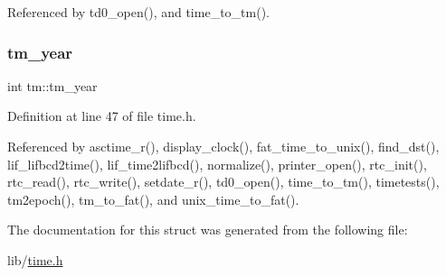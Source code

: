 Referenced by td0\+\_\+open(), and time\+\_\+to\+\_\+tm().

\mbox{\label{structtm_a33adf78fd6476b2120ce3b9c4a852053}} 
\subsubsection{\texorpdfstring{tm\+\_\+year}{tm\_year}}
{\footnotesize\ttfamily int tm\+::tm\+\_\+year}



Definition at line 47 of file time.\+h.



Referenced by asctime\+\_\+r(), display\+\_\+clock(), fat\+\_\+time\+\_\+to\+\_\+unix(), find\+\_\+dst(), lif\+\_\+lifbcd2time(), lif\+\_\+time2lifbcd(), normalize(), printer\+\_\+open(), rtc\+\_\+init(), rtc\+\_\+read(), rtc\+\_\+write(), setdate\+\_\+r(), td0\+\_\+open(), time\+\_\+to\+\_\+tm(), timetests(), tm2epoch(), tm\+\_\+to\+\_\+fat(), and unix\+\_\+time\+\_\+to\+\_\+fat().



The documentation for this struct was generated from the following file\+:\begin{DoxyCompactItemize}
\item 
lib/\hyperlink{time_8h}{time.\+h}\end{DoxyCompactItemize}
